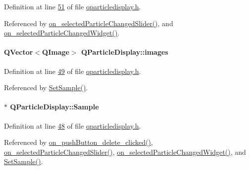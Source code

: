 Definition at line \hyperlink{qparticledisplay_8h_source_l00051}{51} of file \hyperlink{qparticledisplay_8h_source}{qparticledisplay.\+h}.



Referenced by \hyperlink{qparticledisplay_8cpp_source_l00124}{on\+\_\+selected\+Particle\+Changed\+Slider()}, and \hyperlink{qparticledisplay_8cpp_source_l00110}{on\+\_\+selected\+Particle\+Changed\+Widget()}.

\hypertarget{class_q_particle_display_a6b976ba18b8aac401d79c768c5b81ed4}{}
\paragraph[{images}]{\setlength{\rightskip}{0pt plus 5cm}Q\+Vector$<$Q\+Image$>$ Q\+Particle\+Display\+::images\hspace{0.3cm}{\ttfamily [private]}}\label{class_q_particle_display_a6b976ba18b8aac401d79c768c5b81ed4}


Definition at line \hyperlink{qparticledisplay_8h_source_l00049}{49} of file \hyperlink{qparticledisplay_8h_source}{qparticledisplay.\+h}.



Referenced by \hyperlink{qparticledisplay_8cpp_source_l00035}{Set\+Sample()}.

\hypertarget{class_q_particle_display_a24a25733ffa557a66bf7d776b7af8536}{}
\paragraph[{Sample}]{$\ast$ Q\+Particle\+Display\+::\+Sample\hspace{0.3cm}{\ttfamily [private]}}\label{class_q_particle_display_a24a25733ffa557a66bf7d776b7af8536}


Definition at line \hyperlink{qparticledisplay_8h_source_l00048}{48} of file \hyperlink{qparticledisplay_8h_source}{qparticledisplay.\+h}.



Referenced by \hyperlink{qparticledisplay_8cpp_source_l00096}{on\+\_\+push\+Button\+\_\+delete\+\_\+clicked()}, \hyperlink{qparticledisplay_8cpp_source_l00124}{on\+\_\+selected\+Particle\+Changed\+Slider()}, \hyperlink{qparticledisplay_8cpp_source_l00110}{on\+\_\+selected\+Particle\+Changed\+Widget()}, and \hyperlink{qparticledisplay_8cpp_source_l00035}{Set\+Sample()}.

